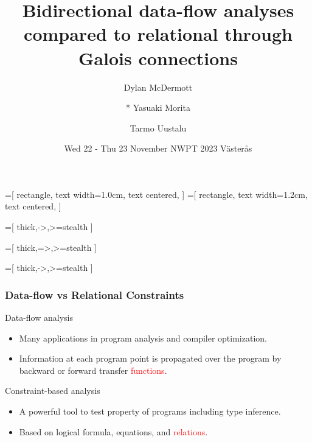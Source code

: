 \documentclass{beamer}
\title{Bidirectional data-flow analyses compared to relational through Galois connections}
\author{
  Dylan McDermott
\and
  * Yasuaki Morita
\and
  Tarmo Uustalu
}
\institute{Reykjavik University}
\date{Wed 22 - Thu 23 November NWPT 2023 V{\"a}ster{\aa}s }
\newcommand{\red}[1]{\textcolor{red}{#1}}
\begin{document}
\begin{frame}
  \titlepage
\end{frame}

\usetikzlibrary{shapes,arrows}

=[
  rectangle,
  text width=1.0cm,
  text centered,
]
=[
  rectangle,
  text width=1.2cm,
  text centered,
]

=[
  thick,->,>=stealth
]

=[
  thick,=>,>=stealth
]

=[
  thick,->,>=stealth
]

\newcommand{\agenda}{\frame{
  \enumerate{
  \item Galois connection between Data-Flow and Relational Constraints
  \item Bidirectional Data-Flow Analysis
  \item Some counter examples
  \item A solution and applications
  }}}

\begin{frame}
  \frametitle {Data-flow vs Relational Constraints}
  \begin{block}{Data-flow analysis}
    \begin{itemize}
    \item Many applications in program analysis and compiler optimization.
    \item Information at each program point is propagated over the program by backward or forward transfer \red{functions}.
    \end{itemize}
  \end{block}
  \begin{block}{Constraint-based analysis}
    \begin{itemize}
    \item A powerful tool to test property of programs including type inference.
    \item Based on logical formula, equations, and \red{relations}.
    \end{itemize}
  \end{block}
\end{frame}
\end{document}
